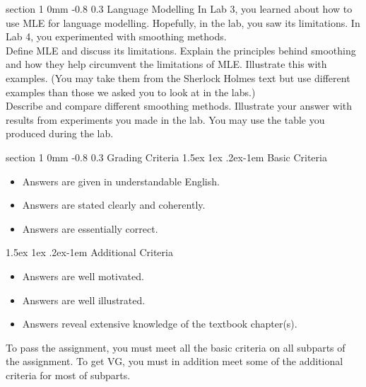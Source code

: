 \documentclass[11pt]{article}
\makeatletter
\newenvironment{titlemize}[1]{%
    \paragraph{#1}
    \begin{itemize}
        \setlength\itemsep{0pt}}
    {\end{itemize}}
\renewcommand{\section}{\@startsection
{section}%
{1}%
{0mm}%
{-0.8\baselineskip}%
{0.3\baselineskip}%
{\bfseries\large}}%
\renewcommand{\paragraph}{%
  \@startsection{paragraph}{4}%
  {\z@}{1.5ex \@plus 1ex \@minus .2ex}{-1em}%
  {\normalfont\normalsize\bfseries}%
}\makeatother
\makeatother
\begin{document}
\section{Language Modelling}
\indent In Lab 3, you learned about how to use MLE for language modelling.
Hopefully, in the lab, you saw its limitations. 
In Lab 4, you experimented with smoothing methods.\\
\indent Define MLE and discuss its limitations. Explain the principles behind
smoothing and how they help circumvent the limitations of MLE. Illustrate this
with examples. (You may take them from the Sherlock Holmes text but use
different examples than those we asked you to look at in the labs.)\\
\indent Describe and compare different smoothing methods.  Illustrate your
answer with results from experiments you made in the lab. You may use the table
you produced during the lab.

\section{Grading Criteria}
\begin{titlemize}{Basic Criteria}
\item Answers are given in understandable English.
\item Answers are stated clearly and coherently.
\item Answers are essentially correct.
\end{titlemize}
\begin{titlemize}{Additional Criteria}
\item Answers are well motivated.
\item Answers are well illustrated.
\item Answers reveal extensive knowledge of the textbook chapter(s).
\end{titlemize}
To pass the assignment, you must meet all the basic criteria on all
subparts of the assignment.  To get VG, you must in addition meet some
of the additional criteria for most of subparts.
\end{document}
